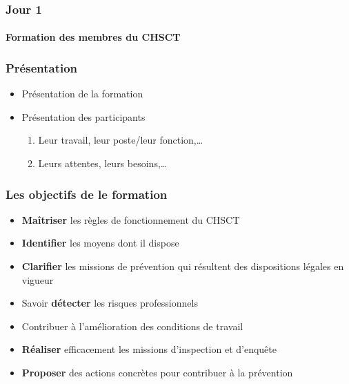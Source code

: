 \documentclass{beamer}
\begin{document}
\begin{frame}
\frametitle{Jour 1}
\framesubtitle{Formation des membres du CHSCT}
\end{frame}

\begin{frame}
\frametitle{Présentation}
\begin{itemize}
\item Présentation de la formation

\item Présentation des participants

\begin{enumerate}
        \item Leur travail, leur poste/leur fonction,…
        \item Leurs attentes, leurs besoins,…
\end{enumerate}
\end{itemize}
\end{frame}




\begin{frame}
\frametitle{Les objectifs de le formation}

\begin{itemize}
\item \textbf{Maîtriser} les règles de fonctionnement du CHSCT

\item \textbf{Identifier} les moyens dont il dispose

\item \textbf{Clarifier} les missions de prévention qui résultent des dispositions légales en vigueur

\item Savoir \textbf{détecter} les risques professionnels

\item Contribuer à l’amélioration des conditions de travail

\item \textbf{Réaliser} efficacement les missions d’inspection et d’enquête

\item \textbf{Proposer} des actions concrètes pour contribuer à la prévention
\end{itemize}
\end{frame}  
\end{document}
